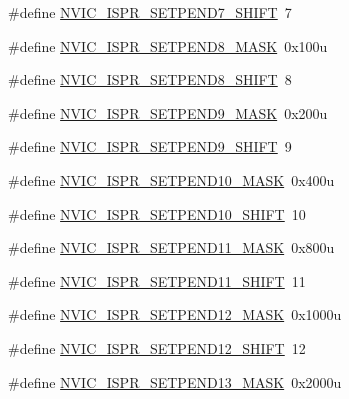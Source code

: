 \begin{DoxyCompactItemize}
\item 
\#define \hyperlink{group___n_v_i_c___register___masks_ga76be38c36982b8f598ba47966112ed23}{N\+V\+I\+C\+\_\+\+I\+S\+P\+R\+\_\+\+S\+E\+T\+P\+E\+N\+D7\+\_\+\+S\+H\+I\+FT}~7
\item 
\#define \hyperlink{group___n_v_i_c___register___masks_ga3e0575e0fb0344ab721826e4e773001b}{N\+V\+I\+C\+\_\+\+I\+S\+P\+R\+\_\+\+S\+E\+T\+P\+E\+N\+D8\+\_\+\+M\+A\+SK}~0x100u
\item 
\#define \hyperlink{group___n_v_i_c___register___masks_gaf5c6f973c6ecda3f7406d6983f4e3dbd}{N\+V\+I\+C\+\_\+\+I\+S\+P\+R\+\_\+\+S\+E\+T\+P\+E\+N\+D8\+\_\+\+S\+H\+I\+FT}~8
\item 
\#define \hyperlink{group___n_v_i_c___register___masks_gad0e1c1d657c6504f1ff53695925d1fc1}{N\+V\+I\+C\+\_\+\+I\+S\+P\+R\+\_\+\+S\+E\+T\+P\+E\+N\+D9\+\_\+\+M\+A\+SK}~0x200u
\item 
\#define \hyperlink{group___n_v_i_c___register___masks_ga66be4663168aeb6638c0d7fed93c8a73}{N\+V\+I\+C\+\_\+\+I\+S\+P\+R\+\_\+\+S\+E\+T\+P\+E\+N\+D9\+\_\+\+S\+H\+I\+FT}~9
\item 
\#define \hyperlink{group___n_v_i_c___register___masks_ga8698f6b4ea84ef15039f3b8828bdee0e}{N\+V\+I\+C\+\_\+\+I\+S\+P\+R\+\_\+\+S\+E\+T\+P\+E\+N\+D10\+\_\+\+M\+A\+SK}~0x400u
\item 
\#define \hyperlink{group___n_v_i_c___register___masks_gafa0ff49a4436936dd29a5237e3cbf024}{N\+V\+I\+C\+\_\+\+I\+S\+P\+R\+\_\+\+S\+E\+T\+P\+E\+N\+D10\+\_\+\+S\+H\+I\+FT}~10
\item 
\#define \hyperlink{group___n_v_i_c___register___masks_ga89ac5b32c32d84a76d8498cb83d338d8}{N\+V\+I\+C\+\_\+\+I\+S\+P\+R\+\_\+\+S\+E\+T\+P\+E\+N\+D11\+\_\+\+M\+A\+SK}~0x800u
\item 
\#define \hyperlink{group___n_v_i_c___register___masks_ga8a1aac2866e9930bdd9e3ccd0e8bb9e8}{N\+V\+I\+C\+\_\+\+I\+S\+P\+R\+\_\+\+S\+E\+T\+P\+E\+N\+D11\+\_\+\+S\+H\+I\+FT}~11
\item 
\#define \hyperlink{group___n_v_i_c___register___masks_gae5f3e0577de81973a6365b166f23da30}{N\+V\+I\+C\+\_\+\+I\+S\+P\+R\+\_\+\+S\+E\+T\+P\+E\+N\+D12\+\_\+\+M\+A\+SK}~0x1000u
\item 
\#define \hyperlink{group___n_v_i_c___register___masks_ga34a389d014f1b64b97a22a22a33404ec}{N\+V\+I\+C\+\_\+\+I\+S\+P\+R\+\_\+\+S\+E\+T\+P\+E\+N\+D12\+\_\+\+S\+H\+I\+FT}~12
\item 
\#define \hyperlink{group___n_v_i_c___register___masks_gadace8b6efcd9c0760b21273d153d4dd4}{N\+V\+I\+C\+\_\+\+I\+S\+P\+R\+\_\+\+S\+E\+T\+P\+E\+N\+D13\+\_\+\+M\+A\+SK}~0x2000u

\end{DoxyCompactItemize}
